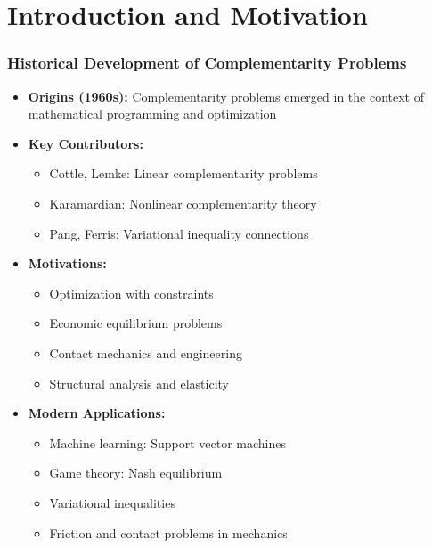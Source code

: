 \documentclass[aspectratio=169,10pt]{beamer}
\begin{document}
\section{Introduction and Motivation}

\begin{frame}
\frametitle{Historical Development of Complementarity Problems}

\begin{itemize}
    \item \textbf{Origins (1960s):} Complementarity problems emerged in the context of mathematical programming and optimization

    \item \textbf{Key Contributors:}
    \begin{itemize}
        \item Cottle, Lemke: Linear complementarity problems
        \item Karamardian: Nonlinear complementarity theory
        \item Pang, Ferris: Variational inequality connections
    \end{itemize}

    \item \textbf{Motivations:}
    \begin{itemize}
        \item Optimization with constraints
        \item Economic equilibrium problems
        \item Contact mechanics and engineering
        \item Structural analysis and elasticity
    \end{itemize}

    \item \textbf{Modern Applications:}
    \begin{itemize}
        \item Machine learning: Support vector machines
        \item Game theory: Nash equilibrium
        \item Variational inequalities
        \item Friction and contact problems in mechanics
    \end{itemize}
\end{itemize}

\end{frame}
\end{document}
